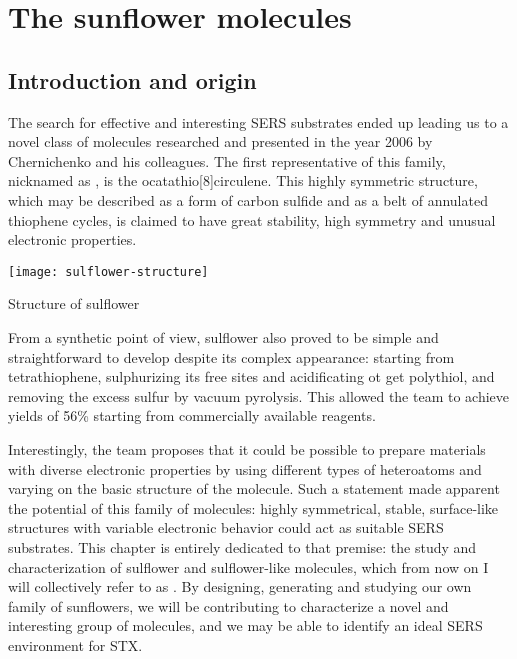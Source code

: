 \chapter{The sunflower molecules}


\section{Introduction and origin}

The search for effective and interesting SERS substrates ended up leading us to a novel class of molecules researched and presented in the year 2006 by Chernichenko and his colleagues.
The first representative of this family, nicknamed as , is the ocatathio[8]circulene.
This highly symmetric structure, which may be described as a form of carbon sulfide and as a belt of annulated thiophene cycles, is claimed to have great stability, high symmetry and unusual electronic properties.

\begin{marginfigure}
    \texttt{[image: sulflower-structure]}
    \caption[Structure of sulflower]{Structure of sulflower}
\end{marginfigure}


From a synthetic point of view, sulflower also proved to be simple and straightforward to develop despite its complex appearance: starting from tetrathiophene, sulphurizing its free sites and acidificating ot get polythiol, and removing the excess sulfur by vacuum pyrolysis.
This allowed the team to achieve yields of 56\% starting from commercially available reagents.

Interestingly, the team proposes that it could be possible to prepare materials with diverse electronic properties by using different types of heteroatoms and varying on the basic structure of the molecule.
Such a statement made apparent the potential of this family of molecules: highly symmetrical, stable, surface-like structures with variable electronic behavior could act as suitable SERS substrates.
This chapter is entirely dedicated to that premise: the study and characterization of sulflower and sulflower-like molecules, which from now on I will collectively refer to as .
By designing, generating and studying our own family of sunflowers, we will be contributing to characterize a novel and interesting group of molecules, and we may be able to identify an ideal SERS environment for STX.


